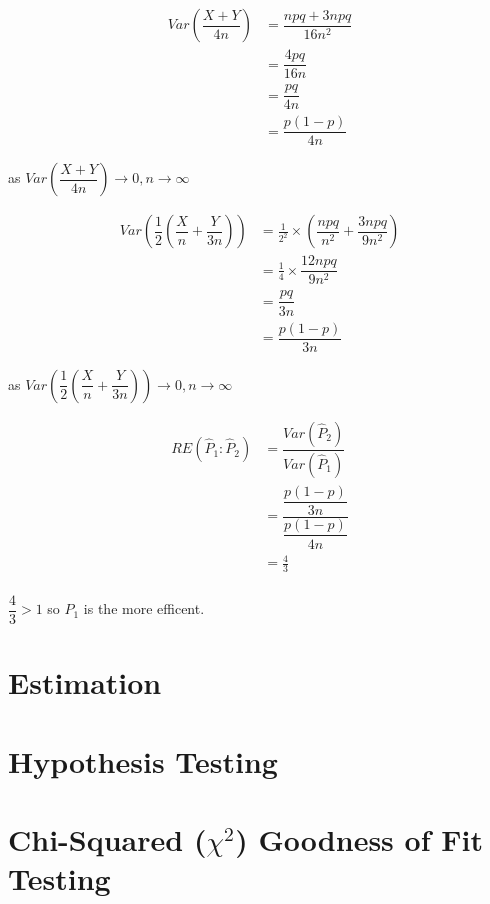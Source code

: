 \begin{example}
\begin{step}
    \begin{align*}
        Var\left(\dfrac{X + Y}{4n}\right) &= \dfrac{npq + 3npq}{16n^2}      \\
        &= \dfrac{4pq}{16n}                                                 \\
        &= \dfrac{pq}{4n}                                                   \\
        &= \dfrac{p(1-p)}{4n}
    \end{align*}

    \begin{center}
    as $Var\left(\dfrac{X + Y}{4n}\right) \rightarrow 0, n \rightarrow \infty$
    \end{center}

    \begin{align*}
        Var\left(\dfrac{1}{2}\left(\dfrac{X}{n} + \dfrac{Y}{3n}\right)\right) &= \frac{1}{2^2} \times \left(\dfrac{npq}{n^2}+\dfrac{3npq}{9n^2}\right)        \\
        &= \frac{1}{4} \times \dfrac{12npq}{9n^2}   \\
        &= \dfrac{pq}{3n}                           \\
        &= \dfrac{p(1-p)}{3n}
    \end{align*}

    \begin{center}
    as $Var\left(\dfrac{1}{2}\left(\dfrac{X}{n} + \dfrac{Y}{3n}\right)\right) \rightarrow 0, n \rightarrow \infty$
    \end{center}

    \begin{align*}
    RE(\hat{P}_1 : \hat{P}_2) &= \dfrac{Var(\hat{P}_2)}{Var(\hat{P}_1)}  \\
    &= \dfrac{\dfrac{p(1-p)}{3n}}{\dfrac{p(1-p)}{4n}}                               \\
    &= \frac{4}{3}                                                                  \\
    \end{align*}

    $\dfrac{4}{3} > 1$ so $\hat{P}_1$ is the more efficent.

    \end{step}

    \end{example}

\section{Estimation}
\section{Hypothesis Testing}
\section{Chi-Squared ($\chi^2$) Goodness of Fit Testing}
